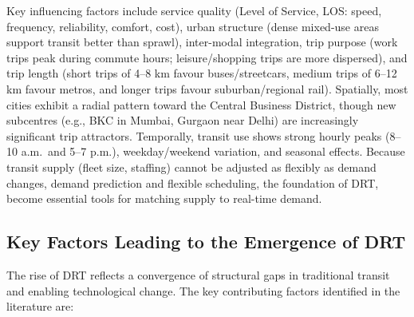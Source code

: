 \documentclass[12pt]{article}
\begin{document}
Key influencing factors include service quality (Level of Service, LOS: speed,
frequency, reliability, comfort, cost), urban structure (dense mixed-use areas
support transit better than sprawl), inter-modal integration, trip purpose (work
trips peak during commute hours; leisure/shopping trips are more dispersed), and
trip length (short trips of 4--8 km favour buses/streetcars, medium trips of 6--12 km
favour metros, and longer trips favour suburban/regional rail). Spatially, most
cities exhibit a radial pattern toward the Central Business District, though new
subcentres (e.g., BKC in Mumbai, Gurgaon near Delhi) are increasingly significant
trip attractors. Temporally, transit use shows strong hourly peaks (8--10 a.m.\ and
5--7 p.m.), weekday/weekend variation, and seasonal effects. Because transit supply
(fleet size, staffing) cannot be adjusted as flexibly as demand changes, demand
prediction and flexible scheduling, the foundation of DRT, become essential tools
for matching supply to real-time demand.

\subsection{Key Factors Leading to the Emergence of DRT}

The rise of DRT reflects a convergence of structural gaps in traditional transit and
enabling technological change. The key contributing factors identified in the
literature are:
\end{document}
